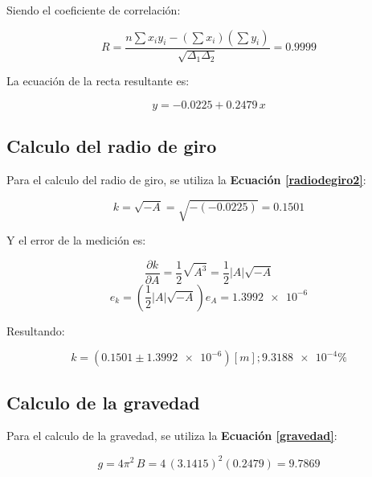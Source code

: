 \documentclass[letter,11pt]{article}
\begin{document}
Siendo el coeficiente de correlación:

\begin{equation*}
    R = \frac{n \sum x_i y_i - (\sum x_i)(\sum y_i)}{\sqrt{\Delta_1 \Delta_2}}
      = 0.9999
\end{equation*}
\vspace{0.10cm}

La ecuación de la recta resultante es:

\begin{equation*}
    y = -0.0225 + 0.2479\,x
\end{equation*}
\vspace{0.10cm}

\subsection{Calculo del radio de giro}

Para el calculo del radio de giro, se utiliza la
\textbf{Ecuación \ref{radiodegiro2}}:

\begin{equation*}
    k = \sqrt{-A} = \sqrt{-(-0.0225)} = 0.1501
\end{equation*}
\vspace{0.10cm}

Y el error de la medición es:

\begin{equation*}
    \frac{\partial k}{\partial A} = \frac{1}{2} \sqrt{A^3}
                                  = \frac{1}{2} |A| \sqrt{-A}
\end{equation*}
\begin{equation*}
    e_k = \left(\frac{1}{2} |A| \sqrt{-A}\right) e_A = \num{1.3992e-6}
\end{equation*}
\vspace{0.10cm}

Resultando:

\begin{equation*}
    k = (0.1501 \pm \num{1.3992e-6}) [m]; \num{9.3188e-4}\%
\end{equation*}
\vspace{0.10cm}

\subsection{Calculo de la gravedad}

Para el calculo de la gravedad, se utiliza la \textbf{Ecuación \ref{gravedad}}:

\begin{equation*}
    g = 4 \pi^2\, B = 4\,(3.1415)^2 (0.2479) = 9.7869
\end{equation*}
\vspace{0.10cm}
\end{document}
